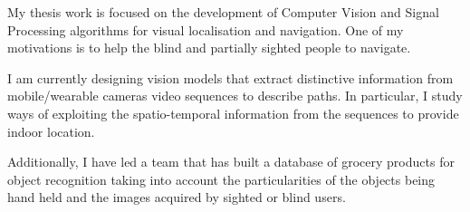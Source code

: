 My thesis work is focused on the development of Computer Vision and Signal Processing algorithms for visual localisation and navigation. One of my motivations is to help the blind and partially sighted people to navigate.

I am currently designing vision models that extract distinctive information from mobile/wearable cameras video sequences to describe paths. In particular, I study ways of exploiting the spatio-temporal information from the sequences to provide indoor location. 

Additionally, I have led a team that has built a database of grocery products for object recognition taking into account the particularities of the objects being hand held and the images acquired by sighted or blind users.
